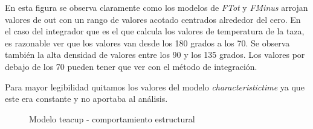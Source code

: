 En esta figura se observa claramente como los modelos de \textit{FTot} y \textit{FMinus} 
arrojan valores de out con un rango de valores acotado centrados alrededor del cero. 
En el caso del integrador que es el que calcula los valores de temperatura de la taza, 
es razonable ver que los valores van desde los 180 grados a los 70. Se observa también 
la alta densidad de valores entre los 90 y los 135 grados. Los valores por debajo de los 
70 pueden tener que ver con el método de integración. 

Para mayor legibilidad quitamos los valores del modelo \textit{characteristictime} 
ya que este era constante y no aportaba al análisis.

\begin{figure}[H]
    \centering     %
        \caption{Modelo teacup - comportamiento estructural}
\end{figure}


